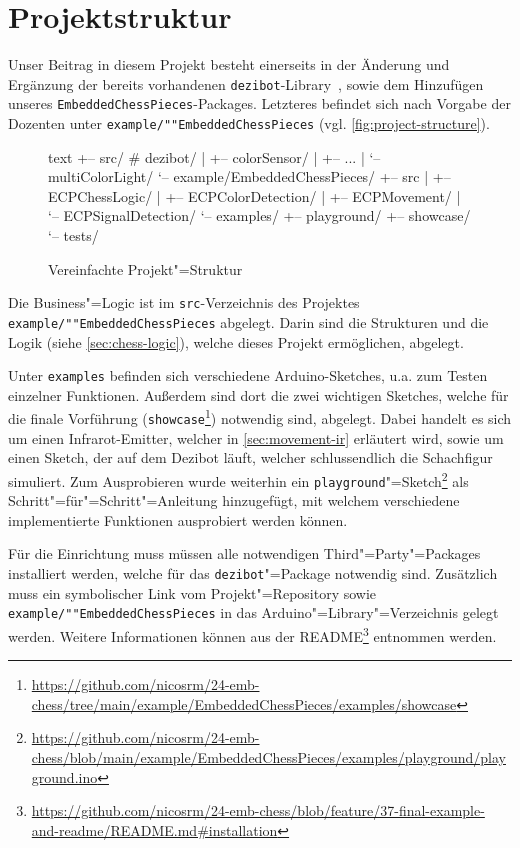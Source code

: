 
\section{Projektstruktur}
\label{sec:final-project-structure}

Unser Beitrag in diesem Projekt besteht einerseits in der Änderung und Ergänzung der bereits vorhandenen \texttt{dezibot}-Library~\cite{dezibotteamDezibotDezibot2025}, sowie dem Hinzufügen unseres \texttt{Embedded\-Chess\-Pieces}-Packages. Letzteres befindet sich nach Vorgabe der Dozenten unter \texttt{example/""Embedded\-Chess\-Pieces} (vgl. \autoref{fig:project-structure}).

\begin{figure}[h]
\centering
\begin{cminted}{text}
+-- src/              # dezibot/
|   +-- colorSensor/
|   +-- ...
|   `-- multiColorLight/
`-- example/EmbeddedChessPieces/
    +-- src
    |   +-- ECPChessLogic/
    |   +-- ECPColorDetection/
    |   +-- ECPMovement/
    |   `-- ECPSignalDetection/
    `-- examples/
        +-- playground/
        +-- showcase/
        `-- tests/
\end{cminted}
\caption{Vereinfachte Projekt"=Struktur}
\label{fig:project-structure}
\end{figure}

Die Business"=Logic ist im \texttt{src}-Verzeichnis des Projektes \texttt{example/""Embedded\-Chess\-Pieces} abgelegt. Darin sind die Strukturen und die Logik (siehe \autoref{sec:chess-logic}), welche dieses Projekt ermöglichen, abgelegt.

Unter \texttt{examples} befinden sich verschiedene Arduino-Sketches, u.a. zum Testen einzelner Funktionen. Außerdem sind dort die zwei wichtigen Sketches, welche für die finale Vorführung (\texttt{showcase}\footnote{\url{https://github.com/nicosrm/24-emb-chess/tree/main/example/EmbeddedChessPieces/examples/showcase}}) notwendig sind, abgelegt. Dabei handelt es sich um einen Infrarot-Emitter, welcher in \autoref{sec:movement-ir} erläutert wird, sowie um einen Sketch, der auf dem Dezibot läuft, welcher schlussendlich die Schachfigur simuliert. Zum Ausprobieren wurde weiterhin ein \texttt{playground}"=Sketch\footnote{\url{https://github.com/nicosrm/24-emb-chess/blob/main/example/EmbeddedChessPieces/examples/playground/playground.ino}} als Schritt"=für"=Schritt"=Anleitung hinzugefügt, mit welchem verschiedene implementierte Funktionen ausprobiert werden können.

Für die Einrichtung muss müssen alle notwendigen Third"=Party"=Packages installiert werden, welche für das \texttt{dezibot}"=Package notwendig sind. Zusätzlich muss ein symbolischer Link vom Projekt"=Repository sowie \texttt{example/""Embedded\-Chess\-Pieces} in das Arduino"=Library"=Verzeichnis gelegt werden. Weitere Informationen können aus der README\footnote{\url{https://github.com/nicosrm/24-emb-chess/blob/feature/37-final-example-and-readme/README.md\#installation}} entnommen werden.
